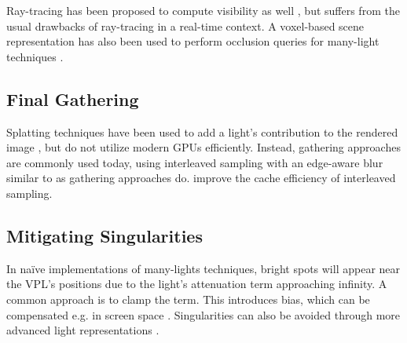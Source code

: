 Ray-tracing has been proposed to compute visibility as well \citep[e.\,g.][]{segovia2006bidirectional}, but suffers from the usual drawbacks of ray-tracing in a real-time context. A voxel-based scene representation has also been used to perform occlusion queries for many-light techniques \citep{sun2015manylightsSVO}.


\subsection{Final Gathering}

Splatting techniques have been used to add a light's contribution to the rendered image \citep{dachsbacher2006splatting, Nichols:2009:splatting}, but do not utilize modern GPUs efficiently. Instead, gathering approaches are commonly used today, using interleaved sampling \citep{Keller:2001:InterleavedSampling} with an edge-aware blur similar to \citep{laine2007incremental} as gathering approaches do. \cite{segovia2006non} improve the cache efficiency of interleaved sampling.



\subsection{Mitigating Singularities}
 In naïve implementations of many-lights techniques, bright spots will appear near the VPL’s positions due to the light’s attenuation term approaching infinity. A common approach is to clamp the term. This introduces bias, which can be compensated e.g. in screen space \citep{novak2011screen}. Singularities can also be avoided through more advanced light representations \citep{tokuyoshi2015vsgl}.


\cleardoublepage
